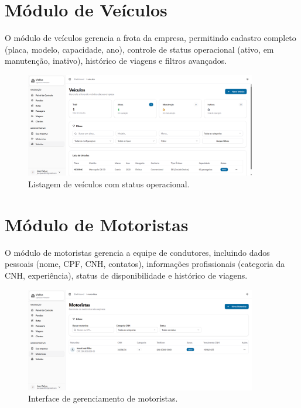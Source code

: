 \section{Módulo de Veículos}

O módulo de veículos gerencia a frota da empresa, permitindo cadastro completo (placa, modelo, capacidade, ano), controle de status operacional (ativo, em manutenção, inativo), histórico de viagens e filtros avançados.

\begin{figure}[H]
  \centering
  \includegraphics[width=0.9\textwidth]{imagens/veiculos.png}
  \caption{Listagem de veículos com status operacional.}
  \label{fig:veiculos}
\end{figure}

\section{Módulo de Motoristas}

O módulo de motoristas gerencia a equipe de condutores, incluindo dados pessoais (nome, CPF, CNH, contatos), informações profissionais (categoria da CNH, experiência), status de disponibilidade e histórico de viagens.

\begin{figure}[H]
  \centering
  \includegraphics[width=0.9\textwidth]{imagens/motoristas.png}
  \caption{Interface de gerenciamento de motoristas.}
  \label{fig:motoristas}
\end{figure}

